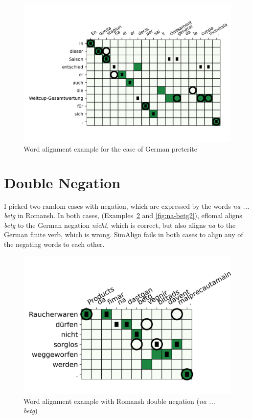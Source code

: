 \begin{figure}[ht]
\includegraphics{graphics/alignments/example-pret.png}
\caption{Word alignment example for the case of German preterite}\label{fig:pret2}
\end{figure}



\section{Double Negation}
I picked two random cases with negation, which are expressed by the words \emph{na ... 
betg} in Romansh. 
In both cases, (Examples~\ref{fig:na-betg1} and \ref{fig:na-betg2}), eflomal aligns \emph{betg} to the German negation \emph{nicht}, which is correct, but also aligns \emph{na} to the German finite verb, which is wrong. 
SimAlign fails in both cases to align any of the negating words to each other.

\begin{figure}[ht]
\includegraphics{graphics/alignments/example5.png}
\caption{Word alignment example with Romansh double negation (\emph{na ... 
betg})}
\label{fig:na-betg1}
\end{figure}

